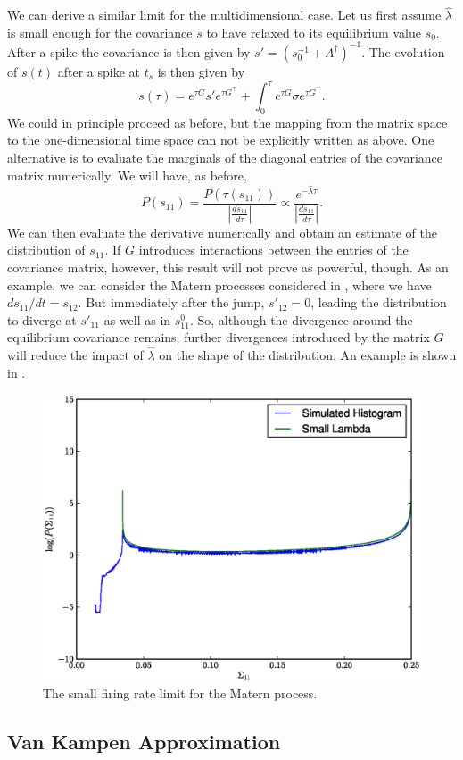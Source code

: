 We can derive a similar limit for the multidimensional case. Let us first assume $\hat{\lambda}$ is small enough for the covariance $s$ to have relaxed to its equilibrium value $s_0$. After a spike the covariance is then given by $s' = \left(s_0^{-1}+A^\dagger\right)^{-1}$. The evolution of $s(t)$ after a spike at $t_s$ is then given by
\[
s(\tau) = e^{\tau G} s' e^{\tau G^\top} + \int_0^\tau e^{\tau G}\sigma e^{\tau G^\top}.
\]
We could in principle proceed as before, but the mapping from the matrix space to the one-dimensional time space can not be explicitly written as above. One alternative is to evaluate the marginals of the diagonal entries of the covariance matrix numerically. We will have, as before,
\[
P(s_{11}) = \frac{P(\tau(s_{11}))}{\left|\frac{d s_{11}}{d\tau}\right|} \propto \frac{e^{-\hat{\lambda} \tau}}{\left|\frac{d s_{11}}{d\tau}\right|}.
\]
We can then evaluate the derivative numerically and obtain an estimate of the distribution of $s_{11}$. If $G$ introduces interactions between the entries of the covariance matrix, however, this result will not prove as powerful, though. As an example, we can consider the Matern processes considered in \citep{Susemihl2012a}, where we have $ds_{11}/dt = s_12$. But immediately after the jump, $s'_{12} = 0$, leading the distribution to diverge at $s'_{11}$ as well as in $s^0_{11}$. So, although the divergence around the equilibrium covariance remains, further divergences introduced by the matrix $G$ will reduce the impact of $\hat{\lambda}$ on the shape of the distribution. An example is shown in .
\begin{figure}
\label{fig:matern_histograms}
\includegraphics[width=\columnwidth]{figures/matern_histogram.eps}
\caption{The small firing rate limit for the Matern process.}
\end{figure}
\subsection{Van Kampen Approximation}


